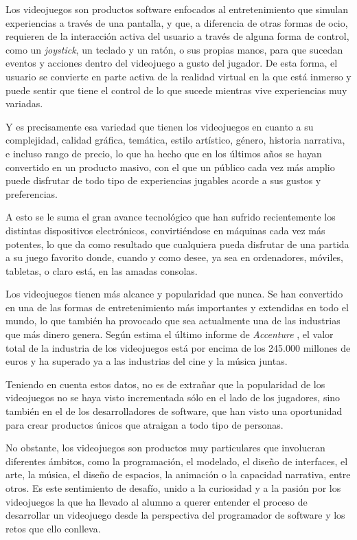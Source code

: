 
Los videojuegos son productos software enfocados al entretenimiento que simulan experiencias a través de una pantalla, y que, a diferencia de otras formas de ocio, requieren de la interacción activa del usuario a través de alguna forma de control, como un \textit{joystick}, un teclado y un ratón, o sus propias manos, para que sucedan eventos y acciones dentro del videojuego a gusto del jugador. De esta forma, el usuario se convierte en parte activa de la realidad virtual en la que está inmerso y puede sentir que tiene el control de lo que sucede mientras vive experiencias muy variadas.

Y es precisamente esa variedad que tienen los videojuegos en cuanto a su complejidad, calidad gráfica, temática, estilo artístico, género, historia narrativa, e incluso rango de precio, lo que ha hecho que en los últimos años se hayan convertido en un producto masivo, con el que un público cada vez más amplio puede disfrutar de todo tipo de experiencias jugables acorde a sus gustos y preferencias.

A esto se le suma el gran avance tecnológico que han sufrido recientemente los distintas dispositivos electrónicos, convirtiéndose en máquinas cada vez más potentes, lo que da como resultado que cualquiera pueda disfrutar de una partida a su juego favorito donde, cuando y como desee, ya sea en ordenadores, móviles, tabletas, o claro está, en las amadas consolas.

Los videojuegos tienen más alcance y popularidad que nunca. Se han convertido en una de las formas de entretenimiento más importantes y extendidas en todo el mundo, lo que también ha provocado que sea actualmente una de las industrias que más dinero genera.
Según estima el último informe de \textit{Accenture} \cite{wiki:videojuegos}, el valor total de la industria de los videojuegos está por encima de los 245.000 millones de euros y ha superado ya a las industrias del cine y la música juntas.

Teniendo en cuenta estos datos, no es de extrañar que la popularidad de los videojuegos no se haya visto incrementada sólo en el lado de los jugadores, sino también en el de los desarrolladores de software, que han visto una oportunidad para crear productos únicos que atraigan a todo tipo de personas.

No obstante, los videojuegos son productos muy particulares que involucran diferentes ámbitos, como la programación, el modelado, el diseño de interfaces, el arte, la música, el diseño de espacios, la animación o la capacidad narrativa, entre otros.                                                   
Es este sentimiento de desafío, unido a la curiosidad y a la pasión por los videojuegos la que ha llevado al alumno a querer entender el proceso de desarrollar  un videojuego desde la perspectiva del programador de software y los retos que ello conlleva.


